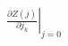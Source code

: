 \documentclass[preview]{standalone}
\begin{document}
\begin{align*}
\left. \frac{\partial Z(j)}{\partial j_k} \right|_{j=0}
\end{align*}
\end{document}

